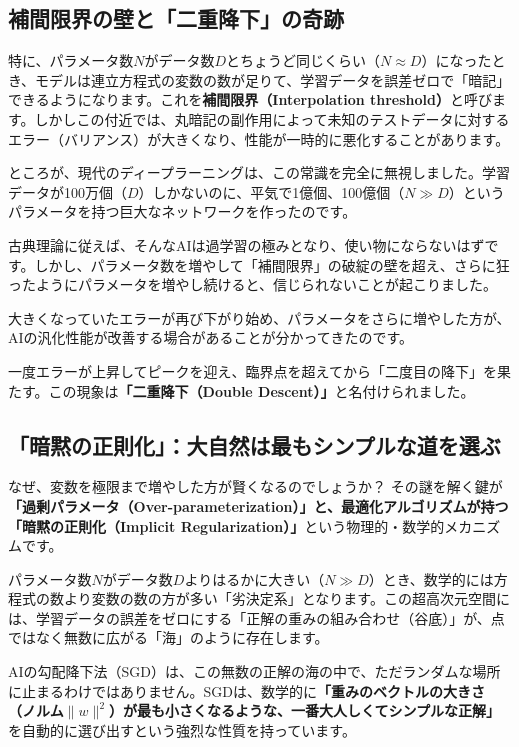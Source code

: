 \subsection{補間限界の壁と「二重降下」の奇跡}

特に、パラメータ数\(N\)がデータ数\(D\)とちょうど同じくらい（\(N \approx D\)）になったとき、モデルは連立方程式の変数の数が足りて、学習データを誤差ゼロで「暗記」できるようになります。これを\textbf{補間限界（Interpolation threshold）}と呼びます。しかしこの付近では、丸暗記の副作用によって未知のテストデータに対するエラー（バリアンス）が大きくなり、性能が一時的に悪化することがあります。

ところが、現代のディープラーニングは、この常識を完全に無視しました。学習データが100万個（\(D\)）しかないのに、平気で1億個、100億個（\(N \gg D\)）というパラメータを持つ巨大なネットワークを作ったのです。

古典理論に従えば、そんなAIは過学習の極みとなり、使い物にならないはずです。しかし、パラメータ数を増やして「補間限界」の破綻の壁を超え、さらに狂ったようにパラメータを増やし続けると、信じられないことが起こりました。

大きくなっていたエラーが再び下がり始め、パラメータをさらに増やした方が、AIの汎化性能が改善する場合があることが分かってきたのです。

一度エラーが上昇してピークを迎え、臨界点を超えてから「二度目の降下」を果たす。この現象は\textbf{「二重降下（Double Descent）」}と名付けられました。

\subsection{「暗黙の正則化」：大自然は最もシンプルな道を選ぶ}

なぜ、変数を極限まで増やした方が賢くなるのでしょうか？ その謎を解く鍵が\textbf{「過剰パラメータ（Over-parameterization）」と、最適化アルゴリズムが持つ「暗黙の正則化（Implicit Regularization）」}という物理的・数学的メカニズムです。

パラメータ数\(N\)がデータ数\(D\)よりはるかに大きい（\(N \gg D\)）とき、数学的には方程式の数より変数の数の方が多い「劣決定系」となります。この超高次元空間には、学習データの誤差をゼロにする「正解の重みの組み合わせ（谷底）」が、点ではなく無数に広がる「海」のように存在します。

AIの勾配降下法（SGD）は、この無数の正解の海の中で、ただランダムな場所に止まるわけではありません。SGDは、数学的に\textbf{「重みのベクトルの大きさ（ノルム\(\|w\|^2\)）が最も小さくなるような、一番大人しくてシンプルな正解」}を自動的に選び出すという強烈な性質を持っています。

